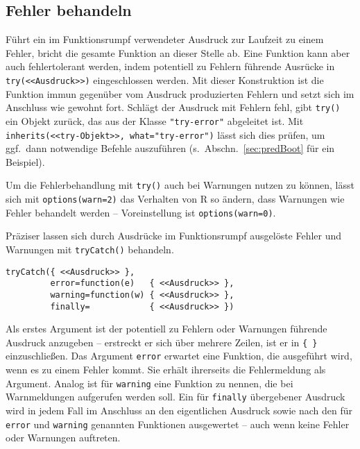 \subsection{Fehler behandeln}
\label{sec:errorHandling}

Führt ein im Funktionsrumpf verwendeter Ausdruck zur Laufzeit zu einem Fehler, bricht die gesamte Funktion an dieser Stelle ab. Eine Funktion kann aber auch fehlertolerant werden, indem potentiell zu Fehlern führende Ausrücke in  \lstinline!try(<<Ausdruck>>)! eingeschlossen werden. Mit dieser Konstruktion ist die Funktion immun gegenüber vom Ausdruck produzierten Fehlern und setzt sich im Anschluss wie gewohnt fort. Schlägt der Ausdruck mit Fehlern fehl, gibt \lstinline!try()! ein Objekt zurück, das aus der Klasse \lstinline!"try-error"! abgeleitet ist. Mit \lstinline!inherits(<<try-Objekt>>, what="try-error")! lässt sich dies prüfen, um ggf.\ dann notwendige Befehle auszuführen (s.\ Abschn.\ \ref{sec:predBoot} für ein Beispiel).

Um die Fehlerbehandlung mit \lstinline!try()! auch bei Warnungen nutzen zu können, lässt sich mit \lstinline!options(warn=2)! das Verhalten von R so ändern, dass Warnungen wie Fehler behandelt werden -- Voreinstellung ist \lstinline!options(warn=0)!.

Präziser lassen sich durch Ausdrücke im Funktionsrumpf ausgelöste Fehler und Warnungen mit  \lstinline!tryCatch()! behandeln.
\begin{lstlisting}
tryCatch({ <<Ausdruck>> },
         error=function(e)   { <<Ausdruck>> },
         warning=function(w) { <<Ausdruck>> },
         finally=            { <<Ausdruck>> })
\end{lstlisting}

Als erstes Argument ist der potentiell zu Fehlern oder Warnungen führende Ausdruck anzugeben -- erstreckt er sich über mehrere Zeilen, ist er in \lstinline!{ }! einzuschließen. Das Argument \lstinline!error! erwartet eine Funktion, die ausgeführt wird, wenn es zu einem Fehler kommt. Sie erhält ihrerseits die Fehlermeldung als Argument. Analog ist für \lstinline!warning! eine Funktion zu nennen, die bei Warnmeldungen aufgerufen werden soll. Ein für \lstinline!finally! übergebener Ausdruck wird in jedem Fall im Anschluss an den eigentlichen Ausdruck sowie nach den für \lstinline!error! und \lstinline!warning! genannten Funktionen ausgewertet -- auch wenn keine Fehler oder Warnungen auftreten.

